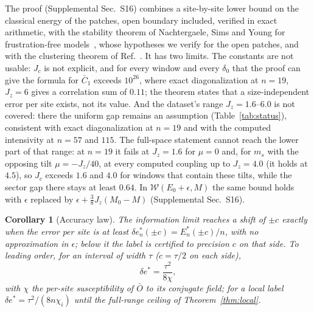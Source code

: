\documentclass[aps,prx,twocolumn,10pt,superscriptaddress,nofootinbib,longbibliography,floatfix]{revtex4-2}
\newtheorem{corollary}{Corollary}
\theoremstyle{remark}
\newcommand{\Jz}{J_z}
\newcommand{\ms}{m_s}
\newcommand{\des}{\delta e^{*}}
\newcommand{\W}{\mathcal{W}}
\begin{document}
The proof (Supplemental Sec.~S16) combines a site-by-site lower bound on the classical energy of the patches, open
boundary included, verified in exact arithmetic, with the stability theorem of Nachtergaele, Sims and Young for
frustration-free models~\cite{nsy2022}, whose hypotheses we verify for the open patches, and with the clustering
theorem of Ref.~\cite{nachtergaele2006}. It has two limits. The constants are not usable: $J_c$ is not explicit,
and for every window and every $\delta_0$ that the proof can give the formula for $\bar C_1$ exceeds $10^{26}$, where exact %
diagonalization at $n=19$, $\Jz=6$ gives a correlation sum of $0.11$; the theorem states that a size-independent %
error per site exists, not its value. And the dataset's range $\Jz=1.6$--$6.0$ is not covered: there the uniform
gap remains an assumption (Table~\ref{tab:status}), consistent with exact diagonalization at $n=19$ and with the
computed intensivity at $n=57$ and $115$. The full-space statement cannot reach the lower part of that range: at
$n=19$ it fails at $\Jz=1.6$ for $\mu=0$ and, for $\ms$ with the opposing tilt $\mu=-\Jz/40$, at every computed %
coupling up to $\Jz=4.0$ (it holds at $4.5$), so $J_c$ exceeds $1.6$ and $4.0$ for windows that contain these %
tilts, while the sector gap there stays at least $0.64$. %
In $\W(E_0+\epsilon,M)$ the same bound holds with $\epsilon$ replaced by $\epsilon+\frac38\Jz(M_0-M)$ %
(Supplemental Sec.~S16). %

\begin{corollary}[Accuracy law]
\label{cor:law}
The information limit reaches a shift of $\pm c$ exactly when the error per site is at least
$\des_n(\pm c)=E^*_n(\pm c)/n$, with no approximation in $\epsilon$; below it the label is certified to precision $c$
on that side. To leading order, for an interval of width $\tau$ ($c=\tau/2$ on each side),
\begin{equation}
\des=\frac{\tau^2}{8\chi}, %
\label{eq:law}
\end{equation}
with $\chi$ the per-site susceptibility of $\bar O$ to its conjugate field; for a local label
$\des=\tau^2/(8n\chi_i)$ until the full-range ceiling of Theorem~\ref{thm:local}.
\end{corollary}
\end{document}
